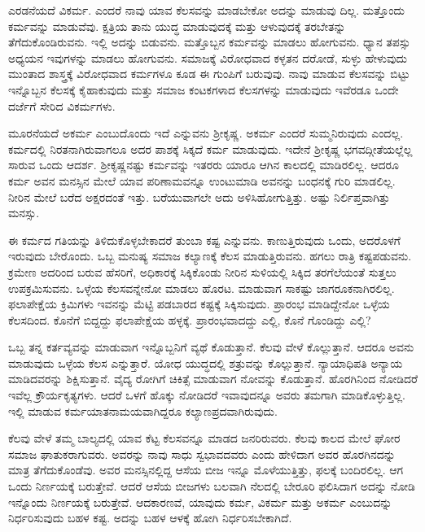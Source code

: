 ಎರಡನೆಯದೆ ವಿಕರ್ಮ. ಎಂದರೆ ನಾವು ಯಾವ ಕೆಲಸವನ್ನು ಮಾಡಬೇಕೋ ಅದನ್ನು ಮಾಡುವು ದಿಲ್ಲ. ಮತ್ತೊಂದು ಕರ್ಮವನ್ನು ಮಾಡುವೆವು. ಕ್ಷತ್ರಿಯ ತಾನು ಯುದ್ಧ ಮಾಡುವುದಕ್ಕೆ ಮತ್ತು ಆಳುವುದಕ್ಕೆ ತರಬೇತನ್ನು ತೆಗೆದುಕೊಂಡಿರುವನು. ಇಲ್ಲಿ ಅದನ್ನು ಬಿಡುವನು. ಮತ್ತೊಬ್ಬನ ಕರ್ಮವನ್ನು ಮಾಡಲು ಹೋಗುವನು. ಧ್ಯಾನ ತಪಸ್ಸು ಅಧ್ಯಯನ ಇವುಗಳನ್ನು ಮಾಡಲು ಹೋಗುವನು. ಸಮಾಜಕ್ಕೆ ವಿರೋಧವಾದ ಕಳ್ಳತನ ದರೋಡೆ, ಸುಳ್ಳು ಹೇಳುವುದು ಮುಂತಾದ ಶಾಸ್ತ್ರಕ್ಕೆ ವಿರೋಧವಾದ ಕರ್ಮಗಳೂ ಕೂಡ ಈ ಗುಂಪಿಗೆ ಬರುವುವು. ನಾವು ಮಾಡುವ ಕೆಲಸವನ್ನು ಬಿಟ್ಟು ಇನ್ನೊಬ್ಬನ ಕೆಲಸಕ್ಕೆ ಕೈಹಾಕುವುದು ಮತ್ತು ಸಮಾಜ ಕಂಟಕಗಳಾದ ಕೆಲಸಗಳನ್ನು ಮಾಡುವುದು ಇವೆರಡೂ ಒಂದೇ ದರ್ಜೆಗೆ ಸೇರಿದ ವಿಕರ್ಮಗಳು.

ಮೂರನೆಯದೆ ಅಕರ್ಮ ಎಂಬುದೊಂದು ಇದೆ ಎನ್ನುವನು ಶ‍್ರೀಕೃಷ್ಣ. ಅಕರ್ಮ ಎಂದರೆ ಸುಮ್ಮನಿರುವುದು ಎಂದಲ್ಲ. ಕರ್ಮದಲ್ಲಿ ನಿರತನಾಗಿರುವಾಗಲೂ ಅದರ ಪಾಶಕ್ಕೆ ಸಿಕ್ಕದೆ ಕರ್ಮ ಮಾಡುವುದು. ಇದೇನೆ ಶ‍್ರೀಕೃಷ್ಣ ಭಗವದ್ಗೀತೆಯಲ್ಲೆಲ್ಲ ಸಾರುವ ಒಂದು ಆದರ್ಶ. ಶ‍್ರೀಕೃಷ್ಣನಷ್ಟು ಕರ್ಮವನ್ನು ಇತರರು ಯಾರೂ ಆಗಿನ ಕಾಲದಲ್ಲಿ ಮಾಡಿರಲಿಲ್ಲ. ಆದರೂ ಕರ್ಮ ಅವನ ಮನಸ್ಸಿನ ಮೇಲೆ ಯಾವ ಪರಿಣಾಮವನ್ನೂ ಉಂಟುಮಾಡಿ ಅವನನ್ನು ಬಂಧನಕ್ಕೆ ಗುರಿ ಮಾಡಲಿಲ್ಲ. ನೀರಿನ ಮೇಲೆ ಬರೆದ ಅಕ್ಷರದಂತೆ ಇತ್ತು. ಬರೆಯುವಾಗಲೇ ಅದು ಅಳಿಸಿಹೋಗುತ್ತಿತ್ತು. ಅಷ್ಟು ನಿರ್ಲಿಪ್ತವಾಗಿತ್ತು ಮನಸ್ಸು.

\newpage

ಈ ಕರ್ಮದ ಗತಿಯನ್ನು ತಿಳಿದುಕೊಳ್ಳಬೇಕಾದರೆ ತುಂಬಾ ಕಷ್ಟ ಎನ್ನುವನು. ಕಾಣುತ್ತಿರುವುದು ಒಂದು, ಅದರೊಳಗೆ ಇರುವುದು ಬೇರೊಂದು. ಒಬ್ಬ ಮನುಷ್ಯ ಸಮಾಜ ಕಲ್ಯಾಣಕ್ಕೆ ಕೆಲಸ ಮಾಡುತ್ತಿರುವನು. ಹಗಲು ರಾತ್ರಿ ಕಷ್ಟಪಡುವನು. ಕ್ರಮೇಣ ಅದರಿಂದ ಬರುವ ಹೆಸರಿಗೆ, ಅಧಿಕಾರಕ್ಕೆ ಸಿಕ್ಕಿಕೊಂಡು ನೀರಿನ ಸುಳಿಯಲ್ಲಿ ಸಿಕ್ಕಿದ ತರಗೆಲೆಯಂತೆ ಸುತ್ತಲು ಉಪಕ್ರಮಿಸುವನು. ಒಳ್ಳೆಯ ಕೆಲಸವನ್ನೇನೋ ಮಾಡಲು ಹೊರಟ. ಮಾಡುವಾಗ ಸಾಕಷ್ಟು ಜಾಗರೂಕನಾಗಿರಲಿಲ್ಲ. ಫಲಾಪೇಕ್ಷೆಯ ಕ್ರಿಮಿಗಳು ಇವನನ್ನು ಮೆಟ್ಟಿ ಪಡಬಾರದ ಕಷ್ಟಕ್ಕೆ ಸಿಕ್ಕಿಸುವುದು. ಪ್ರಾರಂಭ ಮಾಡಿದ್ದೇನೋ ಒಳ್ಳೆಯ ಕೆಲಸದಿಂದ. ಕೊನೆಗೆ ಬಿದ್ದದ್ದು ಫಲಾಪೇಕ್ಷೆಯ ಹಳ್ಳಕ್ಕೆ. ಪ್ರಾರಂಭವಾದದ್ದು ಎಲ್ಲಿ, ಕೊನೆ ಗೊಂಡಿದ್ದು ಎಲ್ಲಿ?

ಒಬ್ಬ ತನ್ನ ಕರ್ತವ್ಯವನ್ನು ಮಾಡುವಾಗ ಇನ್ನೊಬ್ಬನಿಗೆ ವ್ಯಥೆ ಕೊಡುತ್ತಾನೆ. ಕೆಲವು ವೇಳೆ ಕೊಲ್ಲುತ್ತಾನೆ. ಆದರೂ ಅವನು ಮಾಡುವುದು ಒಳ್ಳೆಯ ಕೆಲಸ ಎನ್ನುತ್ತಾರೆ. ಯೋಧ ಯುದ್ಧದಲ್ಲಿ ಶತ್ರುವನ್ನು ಕೊಲ್ಲುತ್ತಾನೆ. ನ್ಯಾಯಾಧಿಪತಿ ಅನ್ಯಾಯ ಮಾಡಿದವರನ್ನು ಶಿಕ್ಷಿಸುತ್ತಾನೆ. ವೈದ್ಯ ರೋಗಿಗೆ ಚಿಕಿತ್ಸೆ ಮಾಡುವಾಗ ನೋವನ್ನು ಕೊಡುತ್ತಾನೆ. ಹೊರಗಿನಿಂದ ನೋಡಿದರೆ ಇವೆಲ್ಲ ಕ್ರೌರ್ಯಕೃತ್ಯಗಳು. ಆದರೆ ಒಳಗೆ ಹೊಕ್ಕು ನೋಡಿದರೆ ಇವಾವುದನ್ನೂ ಅವರು ತಮಗಾಗಿ ಮಾಡಿಕೊಳ್ಳುತ್ತಿಲ್ಲ. ಇಲ್ಲಿ ಮಾಡುವ ಕರ್ಮಯಾತನಾಮಯವಾಗಿದ್ದರೂ ಕಲ್ಯಾಣಪ್ರದವಾಗಿರುವುದು.

ಕೆಲವು ವೇಳೆ ತಮ್ಮ ಬಾಲ್ಯದಲ್ಲಿ ಯಾವ ಕೆಟ್ಟ ಕೆಲಸವನ್ನೂ ಮಾಡದ ಜನರಿರುವರು. ಕೆಲವು ಕಾಲದ ಮೇಲೆ ಘೋರ ಸಮಾಜ ಘಾತುಕರಾಗುವರು. ಅವರನ್ನು ನಾವು ಸಾಧು ಸ್ವಭಾವದವರು ಎಂದು ಹೇಳಿದಾಗ ಅವರ ಹೊರಗಿನದನ್ನು ಮಾತ್ರ ತೆಗೆದುಕೊಂಡೆವು. ಅವರ ಮನಸ್ಸಿನಲ್ಲಿದ್ದ ಆಸೆಯ ಬೀಜ ಇನ್ನೂ ಮೊಳೆಯುತ್ತಿತ್ತು, ಫಲಕ್ಕೆ ಬಂದಿರಲಿಲ್ಲ. ಆಗ ಒಂದು ನಿರ್ಣಯಕ್ಕೆ ಬರುತ್ತೇವೆ. ಆದರೆ ಆಸೆಯ ಬೀಜಗಳು ಬಲವಾಗಿ ನೆಲದಲ್ಲಿ ಬೇರೂರಿ ಫಲಿಸಿದಾಗ ಅದನ್ನು ನೋಡಿ ಇನ್ನೊಂದು ನಿರ್ಣಯಕ್ಕೆ ಬರುತ್ತೇವೆ. ಆದಕಾರಣವೆ, ಯಾವುದು ಕರ್ಮ, ವಿಕರ್ಮ ಮತ್ತು ಅಕರ್ಮ ಎಂಬುದನ್ನು ನಿರ್ಧರಿಸುವುದು ಬಹಳ ಕಷ್ಟ. ಅದನ್ನು ಬಹಳ ಆಳಕ್ಕೆ ಹೋಗಿ ನಿರ್ಧರಿಸಬೇಕಾಗಿದೆ.

